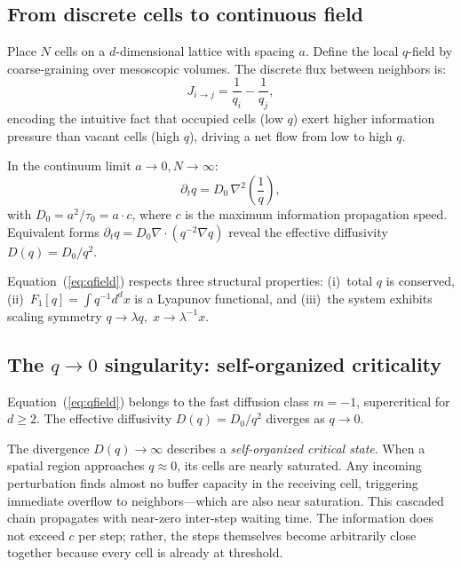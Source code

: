 \documentclass[reprint]{revtex4-2}
\begin{document}
\subsection{From discrete cells to continuous field}

Place $N$ cells on a $d$-dimensional lattice with spacing $a$. Define the local $q$-field by coarse-graining over mesoscopic volumes. The discrete flux between neighbors is:
\begin{equation}
J_{i\to j} = \frac{1}{q_i} - \frac{1}{q_j},
\end{equation}
encoding the intuitive fact that occupied cells (low $q$) exert higher information pressure than vacant cells (high $q$), driving a net flow from low to high $q$.

In the continuum limit $a\to 0, N\to\infty$:
\begin{equation}
\boxed{\partial_t q = D_0\,\nabla^2\!\left(\frac{1}{q}\right)},
\label{eq:qfield}
\end{equation}
with $D_0 = a^2/\tau_0 = a\cdot c$, where $c$ is the maximum information propagation speed. Equivalent forms $\partial_t q = D_0\nabla\cdot(q^{-2}\nabla q)$ reveal the effective diffusivity $D(q)=D_0/q^2$.

Equation~(\ref{eq:qfield}) respects three structural properties: (i)~total $q$ is conserved, (ii)~$F_1[q]=\int q^{-1}d^dx$ is a Lyapunov functional, and (iii)~the system exhibits scaling symmetry $q\to\lambda q,\;x\to\lambda^{-1}x$.

\subsection{The $q\to 0$ singularity: self-organized criticality}

\begin{theorem}
Equation~(\ref{eq:qfield}) belongs to the fast diffusion class $m=-1$, supercritical for $d\ge 2$. The effective diffusivity $D(q)=D_0/q^2$ diverges as $q\to 0$.
\end{theorem}

The divergence $D(q)\to\infty$ describes a \emph{self-organized critical state}. When a spatial region approaches $q\approx 0$, its cells are nearly saturated. Any incoming perturbation finds almost no buffer capacity in the receiving cell, triggering immediate overflow to neighbors---which are also near saturation. This cascaded chain propagates with near-zero inter-step waiting time. The information does not exceed $c$ per step; rather, the steps themselves become arbitrarily close together because every cell is already at threshold.
\end{document}
